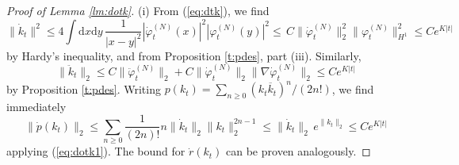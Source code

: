 \documentclass[11pt,a4paper]{article}
\newcommand{\di}{\textrm{d}}		%
\newcommand{\norm}[1]{\lVert#1\rVert}	%
\newcommand{\ph}{\varphi_t^{(N)}}	%
\newcommand{\phdot}{\dot{\varphi}_t^{(N)}}	%
\begin{document}
\begin{proof}[Proof of Lemma \ref{lm:dotk}]
(i) {F}rom (\ref{eq:dtk}), we find
\begin{equation}\label{eq:dotk1}\norm{\dot k_t}^2 \leq 4 \int \di x\di y\, \frac{1}{|x-y|^2}  |\phdot(x)|^2 |\ph(y)|^2 \leq \, C\| \phdot \|_2^2 \| \ph \|_{H^1}^2 \leq C e^{K |t|} \end{equation}
by Hardy's inequality, and from Proposition \ref{t:pdes}, part (iii). Similarly, 
\[ \| \ddot k_t \|_2 \leq C \| \ddot \varphi_t^{(N)} \|_2 + C \| \dot \varphi_t^{(N)} \|_2 \| \nabla \dot \varphi_t^{(N)} \|_2 \leq C e^{K |t|} \]
by Proposition \ref{t:pdes}. Writing $p (k_t) = \sum_{n \geq 0} (k_t \overline{k}_t)^n / (2n!)$, we find immediately
\[ \| \dot p (k_t) \|_2 \leq \sum_{n \geq 0} \frac{1}{(2n)!} n \| \dot k_t \|_2 \| k_t \|_2^{2n-1} \leq \| \dot k_t \|_2 \, e^{ \|k_t \|_2} \leq C e^{K |t|} \]
applying (\ref{eq:dotk1}). The bound for $\dot r (k_t)$ can be proven analogously. 


\end{proof}
\end{document}
